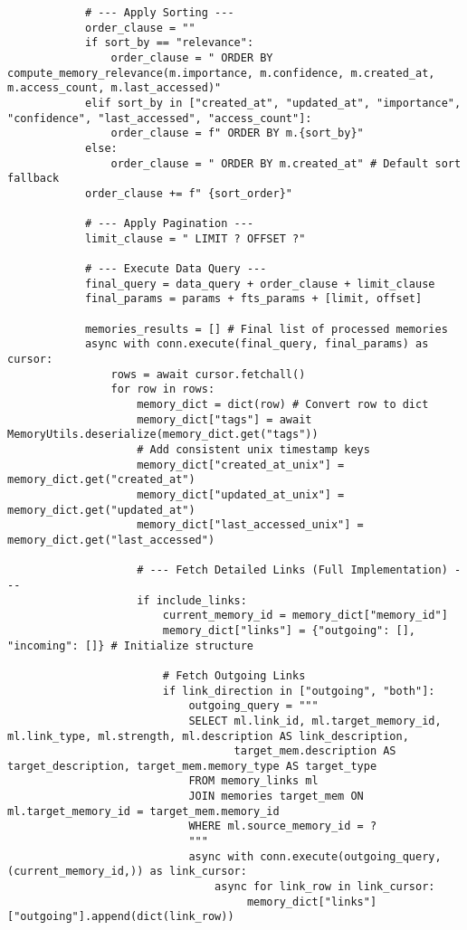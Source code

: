 \documentclass[12pt,a4paper]{article}
\begin{document}
\begin{pageablecode}
\begin{verbatim}
            # --- Apply Sorting ---
            order_clause = ""
            if sort_by == "relevance":
                order_clause = " ORDER BY compute_memory_relevance(m.importance, m.confidence, m.created_at, m.access_count, m.last_accessed)"
            elif sort_by in ["created_at", "updated_at", "importance", "confidence", "last_accessed", "access_count"]:
                order_clause = f" ORDER BY m.{sort_by}"
            else:
                order_clause = " ORDER BY m.created_at" # Default sort fallback
            order_clause += f" {sort_order}"

            # --- Apply Pagination ---
            limit_clause = " LIMIT ? OFFSET ?"

            # --- Execute Data Query ---
            final_query = data_query + order_clause + limit_clause
            final_params = params + fts_params + [limit, offset]

            memories_results = [] # Final list of processed memories
            async with conn.execute(final_query, final_params) as cursor:
                rows = await cursor.fetchall()
                for row in rows:
                    memory_dict = dict(row) # Convert row to dict
                    memory_dict["tags"] = await MemoryUtils.deserialize(memory_dict.get("tags"))
                    # Add consistent unix timestamp keys
                    memory_dict["created_at_unix"] = memory_dict.get("created_at")
                    memory_dict["updated_at_unix"] = memory_dict.get("updated_at")
                    memory_dict["last_accessed_unix"] = memory_dict.get("last_accessed")

                    # --- Fetch Detailed Links (Full Implementation) ---
                    if include_links:
                        current_memory_id = memory_dict["memory_id"]
                        memory_dict["links"] = {"outgoing": [], "incoming": []} # Initialize structure

                        # Fetch Outgoing Links
                        if link_direction in ["outgoing", "both"]:
                            outgoing_query = """
                            SELECT ml.link_id, ml.target_memory_id, ml.link_type, ml.strength, ml.description AS link_description,
                                   target_mem.description AS target_description, target_mem.memory_type AS target_type
                            FROM memory_links ml
                            JOIN memories target_mem ON ml.target_memory_id = target_mem.memory_id
                            WHERE ml.source_memory_id = ?
                            """
                            async with conn.execute(outgoing_query, (current_memory_id,)) as link_cursor:
                                async for link_row in link_cursor:
                                     memory_dict["links"]["outgoing"].append(dict(link_row))


\end{verbatim}
\end{pageablecode}
\end{document}

